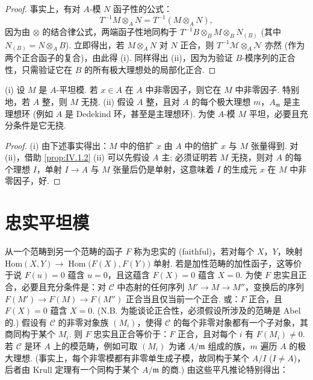 \begin{proof}
事实上，有对 $A$-模 $N$ 函子性的公式：
\[
T^{-1}M \otimes_A N = T^{-1}(M \otimes_A N),
\]
因为由 $\otimes$ 的结合律公式，两端函子性地同构于 $T^{-1}B \otimes_B M \otimes_B N_{(B)}$ (其中 $N_{(B)} = N \otimes_A B$). 立即得出，若 $M \otimes_A N$ 对 $N$ 正合，则 $T^{-1}\mathcal{M} \otimes_A \mathcal{N}$ 亦然 (作为两个正合函子的复合)，由此得 (i). 同样得出 (ii)，因为为验证 $B$-模序列的正合性，只需验证它在 $B$ 的所有极大理想处的局部化正合.
\end{proof}

\begin{proposition}\label{prop:IV.1.3}
(i) 设 $M$ 是 $A$-平坦模. 若 $x \in A$ 在 $A$ 中非零因子，则它在 $M$ 中非零因子. 特别地，若 $A$ 整，则 $M$ 无挠.
(ii) 假设 $A$ 整，且对 $A$ 的每个极大理想 $m$，$A_{\mathfrak{m}}$ 是主理想环 (例如 $A$ 是 Dedekind 环，甚至是主理想环). 为使 $A$-模 $M$ 平坦，必要且充分条件是它无挠.
\end{proposition}

\begin{proof}
(i) 由下述事实得出：$M$ 中的倍扩 $x$ 由 $A$ 中的倍扩 $x$ 与 $M$ 张量得到. 对 (ii)，借助 \ref{prop:IV.1.2} (ii) 可以先假设 $A$ 主; 必须证明若 $M$ 无挠，则对 $A$ 的每个理想 $I$，单射 $I \to A$ 与 $M$ 张量后仍是单射，这意味着 $I$ 的生成元 $x$ 在 $M$ 中非零因子，好.
\end{proof}

\section{忠实平坦模}

从一个范畴到另一个范畴的函子 $F$ 称为忠实的 (faithful)，若对每个 $X$，$Y$，映射 $\mathrm{Hom}(X, Y) \to \operatorname{Hom}\bigl(F(X), F(Y)\bigr)$ 单射. 若是加性范畴的加性函子，这等价于说 $F(u) = 0$ 蕴含 $u = 0$，且这蕴含 $F(X) = 0$ 蕴含 $X = 0$. 为使 $F$ 忠实且正合，必要且充分条件是：对 $\mathcal{C}$ 中态射的任何序列 $M' \to M \to M''$，变换后的序列 $F(M') \to F(M) \to F(M'')$ 正合当且仅当前一个正合. 或：$F$ 正合，且 $F(X) = 0$ 蕴含 $X = 0$. (N.B. 为能谈论正合性，必须假设所涉及的范畴是 Abel 的.) 假设有 $\mathcal{C}$ 的非零对象族 $(M_i)$，使得 $\mathcal{C}$ 的每个非零对象都有一个子对象，其商同构于某个 $M_i$. 则 $F$ 忠实且正合等价于：$F$ 正合，且对每个 $i$ 有 $F(M_i) \neq 0$. 若 $\mathcal{C}$ 是环 $A$ 上的模范畴，例如可取 $(M_i)$ 为诸 $A/\mathfrak{m}$ 组成的族，$m$ 遍历 $A$ 的极大理想. (事实上，每个非零模都有非零单生成子模，故同构于某个 $A/I$ ($I \neq A$)，后者由 Krull 定理有一个同构于某个 $A/\mathfrak{m}$ 的商.) 由这些平凡推论特别得出：

